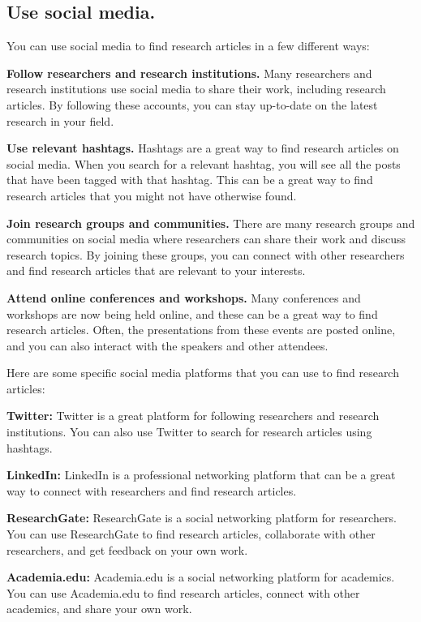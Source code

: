 \documentclass[
  b5paper]{book}
\begin{document}
\hypertarget{use-social-media.}{%
\subsection*{Use social media.}\label{use-social-media.}}

You can use social media to find research articles in a few different ways:

\textbf{Follow researchers and research institutions.} Many researchers and research institutions use social media to share their work, including research articles. By following these accounts, you can stay up-to-date on the latest research in your field.

\textbf{Use relevant hashtags.} Hashtags are a great way to find research articles on social media. When you search for a relevant hashtag, you will see all the posts that have been tagged with that hashtag. This can be a great way to find research articles that you might not have otherwise found.

\textbf{Join research groups and communities.} There are many research groups and communities on social media where researchers can share their work and discuss research topics. By joining these groups, you can connect with other researchers and find research articles that are relevant to your interests.

\textbf{Attend online conferences and workshops.} Many conferences and workshops are now being held online, and these can be a great way to find research articles. Often, the presentations from these events are posted online, and you can also interact with the speakers and other attendees.

Here are some specific social media platforms that you can use to find research articles:

\textbf{Twitter:} Twitter is a great platform for following researchers and research institutions. You can also use Twitter to search for research articles using hashtags.

\textbf{LinkedIn:} LinkedIn is a professional networking platform that can be a great way to connect with researchers and find research articles.

\textbf{ResearchGate:} ResearchGate is a social networking platform for researchers. You can use ResearchGate to find research articles, collaborate with other researchers, and get feedback on your own work.

\textbf{Academia.edu:} Academia.edu is a social networking platform for academics. You can use Academia.edu to find research articles, connect with other academics, and share your own work.
\end{document}
